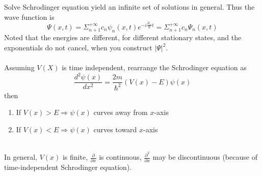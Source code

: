 \documentclass{article}
\numberwithin{equation}{section}
\begin{document}
Solve Schrodinger equation yield an infinite set of solutions in general. Thus the wave function is
\begin{equation}
	\Psi(x,t)=\Sigma_{n+1}^{+\infty}c_n\psi_n(x,t)e^{-i\frac{E_n}{\hbar}t}=\Sigma_{n+1}^{+\infty}c_n\Psi_n(x,t)
\end{equation}
Noted that the energies are different, for different stationary states, and the exponentials do not cancel, when you construct $|\Psi|^2$.
\\
\\
Assuming $V(X)$ is time independent, rearrange the Schrodinger equation as
\begin{equation}
	\frac{d^2 \psi(x)}{d x^2}=\frac{2m}{\hbar^2}(V(x)-E)\psi(x)
\end{equation}
then 
\begin{enumerate}
	\item If $V(x)>E\Rightarrow \psi(x)$ curves away from $x$-axis
	\item If $V(x)<E\Rightarrow \psi(x)$ curves toward $x$-axis\\\\
\end{enumerate}
In general, $V(x)$ is finite, $\frac{\partial}{\partial x}$ is continuous, $\frac{\partial^2}{\partial x}$ may be discontinuous (because of time-independent Schrodinger equation).
\end{document}
